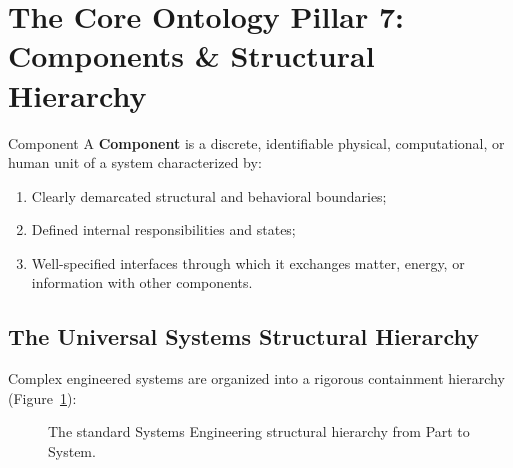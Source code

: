 \section{The Core Ontology Pillar 7: Components \& Structural Hierarchy}
\label{sec:ontology_components}

\begin{definitionbox}{Component}
A \textbf{Component} is a discrete, identifiable physical, computational, or human unit of a system characterized by:
\begin{enumerate}[label=(\alph*), itemsep=1pt]
    \item Clearly demarcated structural and behavioral boundaries;
    \item Defined internal responsibilities and states;
    \item Well-specified interfaces through which it exchanges matter, energy, or information with other components.
\end{enumerate}
\end{definitionbox}

\subsection{The Universal Systems Structural Hierarchy}
Complex engineered systems are organized into a rigorous containment hierarchy (Figure~\ref{fig:structural_hierarchy}):

\begin{figure}[htbp]
\centering
{}
\caption{The standard Systems Engineering structural hierarchy from Part to System.}
\label{fig:structural_hierarchy}
\end{figure}


